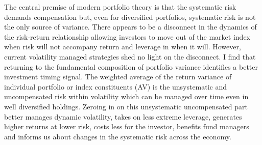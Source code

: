 The central premise of modern portfolio theory is that the systematic risk demands compensation but, even for diversified portfolios, systematic risk is not the only source of variance. There appears to be a disconnect in the dynamics of the risk-return relationship allowing investors to move out of the market index when risk will not accompany return and leverage in when it will. However, current volatility managed strategies shed no light on the disconnect. I find that returning to the fundamental composition of portfolio variance identifies a better investment timing signal. The weighted average of the return variance of individual portfolio or index constituents (AV) is the unsystematic and uncompensated risk within volatility which can be managed over time even in well diversified holdings. Zeroing in on this unsystematic uncompensated part better manages dynamic volatility, takes on less extreme leverage, generates higher returns at lower risk, costs less for the investor, benefits fund managers and informs us about changes in the systematic risk across the economy. 

